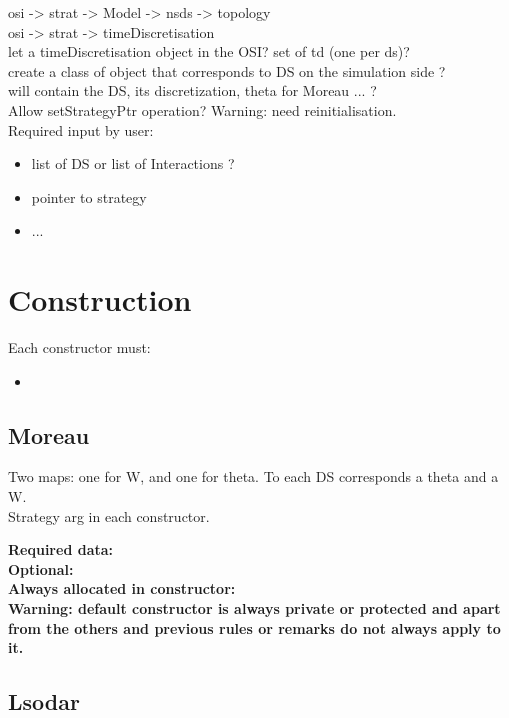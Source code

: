 \documentclass[10pt]{report}
\begin{document}
osi -> strat -> Model -> nsds -> topology \\
osi -> strat -> timeDiscretisation \\

let a timeDiscretisation object in the OSI? set of td (one per ds)? \\
create a class of object that corresponds to DS on the simulation side ? \\
will contain the DS, its discretization, theta for Moreau ... ? \\ 
Allow setStrategyPtr operation? Warning: need reinitialisation. \\


Required input by user: \\
\begin{itemize}
\item list of DS or list of Interactions ? 
\item pointer to strategy
\item ...
\end{itemize}

\section{Construction}

Each constructor must:

\begin{itemize}
\item
\end{itemize}

\subsection{Moreau}

Two maps: one for W, and one for theta. To each DS corresponds a theta and a W. \\
Strategy arg in each constructor.

\bf{Required data:}\\

\bf{Optional:}\\

\bf{Always allocated in constructor:} \\

Warning: default constructor is always private or protected and apart from the others and previous rules or remarks do not always apply to it. 

\subsection{Lsodar}
\end{document}

